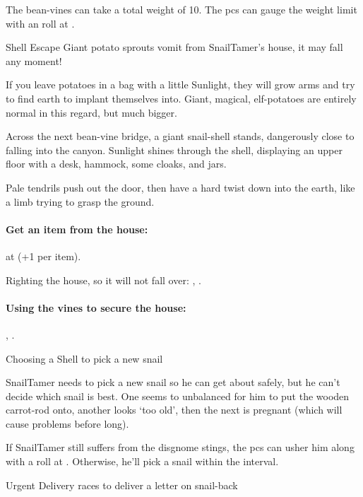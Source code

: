 The bean-vines can take a total \gls{weight} of 10.
The \glspl{pc} can gauge the weight limit with an  roll at \tn[8].

{Shell Escape}%
{Giant potato sprouts vomit from \gls{SnailTamer}'s house, it may fall any moment!}%

If you leave potatoes in a bag with a little Sunlight, they will grow arms and try to find earth to implant themselves into.
Giant, magical, elf-potatoes are entirely normal in this regard, but much bigger.

\begin{speechtext}
  Across the next bean-vine bridge, a giant snail-shell stands, dangerously close to falling into the canyon.
  Sunlight shines through the shell, displaying an upper floor with a desk, hammock, some cloaks, and jars.

  Pale tendrils push out the door, then have a hard twist down into the earth, like a limb trying to grasp the ground.
\end{speechtext}

\paragraph{Get an item from the house:}
 at \tn[12] (+1 per item).

Righting the house, so it will not fall over:
, \tn[12].

\paragraph{Using the vines to secure the house:}
, \tn[10].


{Choosing a Shell}%
{ to pick a new snail}%

\Gls{SnailTamer} needs to pick a new snail so he can get about safely, but he can't decide which snail is best.
One seems to unbalanced for him to put the wooden carrot-rod onto, another looks `too old', then the next is pregnant (which will cause problems before long).

If \gls{SnailTamer} still suffers from the \gls{disgnome} stings,
the \glspl{pc} can usher him along with a  roll at \tn[10].
Otherwise, he'll pick a snail within the \gls{interval}.

{Urgent Delivery}%
{ races to deliver a letter on snail-back}%

